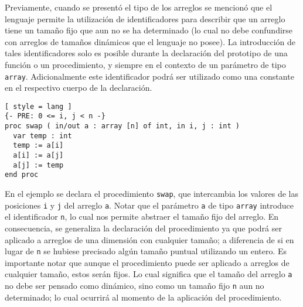 Previamente, cuando se presentó el tipo de los arreglos se mencionó que el lenguaje permite la utilización de identificadores para describir que un arreglo tiene un tamaño fijo que aun no se ha determinado (lo cual no debe confundirse con arreglos de tamaños dinámicos que el lenguaje no posee).
La introducción de tales identificadores solo es posible durante la declaración del prototipo de una función o un procedimiento, y siempre en el contexto de un parámetro de tipo \lstinline[style = lang]{array}.
Adicionalmente este identificador podrá ser utilizado como una constante en el respectivo cuerpo de la declaración.

\iffalse
El lenguaje permite definir funciones y procedimientos donde sus parámetros serán arreglos de tamaños dinámicos.
De esta manera es posible emplear identificadores para representar el tamaño de ciertas dimensiones, cuyo valor deberá ser resuelto durante la ejecución del programa.
En el cuerpo de funciones y procedimientos, se podrán utilizar los identificadores introducidos en el respectivo prototipo como valores constantes.
\fi

\begin{lstlisting}[ style = lang ]
{- PRE: 0 <= i, j < n -}
proc swap ( in/out a : array [n] of int, in i, j : int )
  var temp : int
  temp := a[i]
  a[i] := a[j]
  a[j] := temp
end proc
\end{lstlisting}

En el ejemplo se declara el procedimiento \lstinline[style = lang]{swap}, que intercambia los valores de las posiciones \lstinline[style = lang]{i} y \lstinline[style = lang]{j} del arreglo \lstinline[style = lang]{a}.
Notar que el parámetro \lstinline[style = lang]{a} de tipo \lstinline[style = lang]{array} introduce el identificador \lstinline[style = lang]{n}, lo cual nos permite abstraer el tamaño fijo del arreglo.
En consecuencia, se generaliza la declaración del procedimiento ya que podrá ser aplicado a arreglos de una dimensión con cualquier tamaño; a diferencia de si en lugar de \lstinline[style = lang]{n} se hubiese precisado algún tamaño puntual utilizando un entero.
Es importante notar que aunque el procedimiento puede ser aplicado a arreglos de cualquier tamaño, estos serán fijos.
Lo cual significa que el tamaño del arreglo \lstinline[style = lang]{a} no debe ser pensado como dinámico, sino como un tamaño fijo \lstinline[style = lang]{n} aun no determinado; lo cual ocurrirá al momento de la aplicación del procedimiento.

\iffalse
Al utilizar el identificador \lstinline[style = lang]{n}, es posible abstraernos del tamaño concreto del arreglo y especificar un procedimiento que será independiente de su valor.
A lo largo del programa, se podrá aplicar el procedimiento con arreglos de distintos tamaños.
\fi

